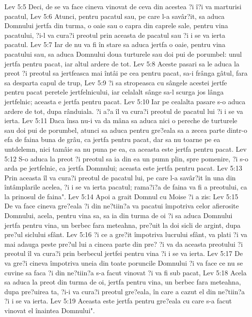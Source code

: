 Lev 5:5  Deci, de se va face cineva vinovat de ceva din acestea ?i î?i va marturisi pacatul,
Lev 5:6  Atunci, pentru pacatul sau, pe care l-a savâr?it, sa aduca Domnului jertfa din turma, o oaie sau o capra din caprele sale, pentru vina pacatului, ?i-l va cura?i preotul prin aceasta de pacatul sau ?i i se va ierta pacatul.
Lev 5:7  Iar de nu va fi în stare sa aduca jertfa o oaie, pentru vina pacatului sau, sa aduca Domnului doua turturele sau doi pui de porumbel: unul jertfa pentru pacat, iar altul ardere de tot.
Lev 5:8  Aceste pasari sa le aduca la preot ?i preotul sa jertfeasca mai întâi pe cea pentru pacat, sa-i frânga gâtul, fara sa desparta capul de trup,
Lev 5:9  ?i sa stropeasca cu sângele acestei jertfe pentru pacat peretele jertfelnicului, iar celalalt sânge sa-l scurga jos lânga jertfelnic; aceasta e jertfa pentru pacat.
Lev 5:10  Iar pe cealalta pasare s-o aduca ardere de tot, dupa rânduiala. ?i a?a îl va cura?i preotul de pacatul lui ?i i se va ierta.
Lev 5:11  Daca însa nu-i va da mâna sa aduca nici o pereche de turturele sau doi pui de porumbel, atunci sa aduca pentru gre?eala sa a zecea parte dintr-o efa de faina buna de grâu, ca jertfa pentru pacat, dar sa nu toarne pe ea untdelemn, nici tamâie sa nu puna pe ea, ca aceasta este jertfa pentru pacat.
Lev 5:12  S-o aduca la preot ?i preotul sa ia din ea un pumn plin, spre pomenire, ?i s-o arda pe jertfelnic, ca jertfa Domnului; aceasta este jertfa pentru pacat.
Lev 5:13  Prin aceasta îl va cura?i preotul de pacatul lui, pe care l-a savâr?it în una din întâmplarile acelea, ?i i se va ierta pacatul; rama?i?a de faina va fi a preotului, ca la prinosul de faina".
Lev 5:14  Apoi a grait Domnul cu Moise ?i a zis:
Lev 5:15  De va face cineva gre?eala ?i din ne?tiin?a va pacatui împotriva celor afierosite Domnului, acela, pentru vina sa, sa ia din turma de oi ?i sa aduca Domnului jertfa pentru vina, un berbec fara meteahna, pre?uit la doi sicli de argint, dupa pre?ul siclului sfânt.
Lev 5:16  ?i ce a gre?it împotriva lucrului sfânt, va plati ?i va mai adauga peste pre?ul lui a cincea parte din pre? ?i va da aceasta preotului ?i preotul îl va cura?i prin berbecul jertfei pentru vina ?i i se va ierta.
Lev 5:17  De va gre?i cineva împotriva uneia din toate poruncile Domnului ?i va face ce nu se cuvine sa faca ?i din ne?tiin?a s-a facut vinovat ?i va fi sub pacat,
Lev 5:18  Acela sa aduca la preot din turma de oi, jertfa pentru vina, un berbec fara meteahna, dupa pre?uirea ta, ?i-i va cura?i preotul gre?eala, în care a cazut el din ne?tiin?a ?i i se va ierta.
Lev 5:19  Aceasta este jertfa pentru gre?eala cu care s-a facut vinovat el înaintea Domnului".
